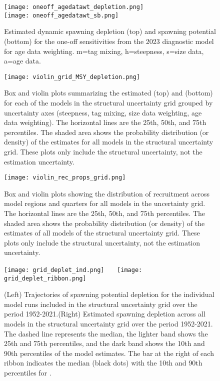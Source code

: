 \newpage
\begin{figure}[!ht]
  \centering
  \texttt{[image: oneoff\_agedatawt\_depletion.png]}\\[4mm]
  \texttt{[image: oneoff\_agedatawt\_sb.png]}
  \caption{Estimated dynamic spawning depletion (top) and spawning potential (bottom) for the one-off sensitivities from the 2023 diagnostic model for age data weighting. m=tag mixing, h=steepness, s=size data, a=age data. \label{fig:one_off_sens_agedatawt}}
\end{figure}
\clearpage

\newpage
\begin{figure}[!ht]
  \centering
  \texttt{[image: violin\_grid\_MSY\_depletion.png]}
  \caption{Box and violin plots summarizing the estimated \fref (top) and \sbrsbfo (bottom) for each of the models in the structural uncertainty grid grouped by uncertainty axes (steepness, tag mixing, size data weighting, age data weighting). The horizontal lines are the 25th, 50th, and 75th percentiles. The shaded area shows the probability distribution (or density) of the estimates for all models in the structural uncertainty grid. These plots only include the structural uncertainty, not the estimation uncertainty.
    \label{fig:violin_grid_axes}}
\end{figure}
\clearpage

\newpage
\begin{figure}[!ht]
  \centering
  \texttt{[image: violin\_rec\_props\_grid.png]}
  \caption{Box and violin plots showing the distribution of recruitment across model regions and quarters for all models in the uncertainty grid. The horizontal lines are the 25th, 50th, and 75th percentiles. The shaded area shows the probability distribution (or density) of the estimates of all models of the structural uncertainty grid. These plots only include the structural uncertainty, not the estimation uncertainty.
    \label{fig:violin_rec_props_grid}}
\end{figure}
\clearpage

\newpage
\begin{landscape}
  \begin{figure}[!ht]
    \centering
    \texttt{[image: grid\_deplet\_ind.png]}~~~
    \texttt{[image: grid\_deplet\_ribbon.png]}
    \caption{(Left) Trajectories of spawning potential depletion for the individual model runs included in the structural uncertainty grid over the period 1952-2021.(Right) Estimated spawning depletion across all models in the structural uncertainty grid over the period 1952-2021. The dashed line represents the median, the lighter band shows the 25th and 75th percentiles, and the dark band shows the 10th and 90th percentiles of the model estimates. The bar at the right of each ribbon indicates the median (black dots) with the 10th and 90th percentiles for \sbrsbfo. \label{fig:grid-depletion}}
  \end{figure}
\end{landscape}
\clearpage

